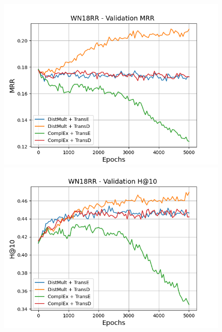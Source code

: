 \begin{figure}
    \centering
    \begin{minipage}{.5\textwidth}
      \centering
      \includegraphics[width=\linewidth]{figures/results/gan_train/pretrained/uncertainty/max/entropy/wn18rr/5k_epochs/uncertainty_wn18rr_mrrs.png}
    \end{minipage}%
    \begin{minipage}{.5\textwidth}
      \centering
      \includegraphics[width=\linewidth]{figures/results/gan_train/pretrained/uncertainty/max/entropy/wn18rr/5k_epochs/uncertainty_wn18rr_hit10.png}
    \end{minipage}
    

\end{figure}
